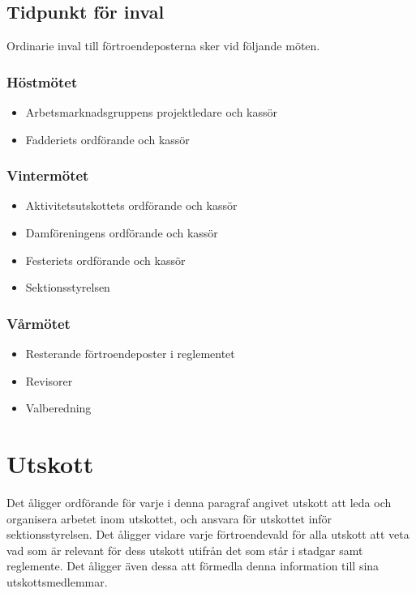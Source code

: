 \documentclass{datateknologsektionen-document}
\begin{document}
\subsection{Tidpunkt för inval}
Ordinarie inval till förtroendeposterna sker vid följande möten.

\subsubsection{Höstmötet}
\begin{itemize}
  \item Arbetsmarknadsgruppens projektledare och kassör
  \item Fadderiets ordförande och kassör
\end{itemize}

\subsubsection{Vintermötet}
\begin{itemize}
  \item Aktivitetsutskottets ordförande och kassör
  \item Damföreningens ordförande och kassör
  \item Festeriets ordförande och kassör
  \item Sektionsstyrelsen
\end{itemize}

\subsubsection{Vårmötet}
\begin{itemize}
  \item Resterande förtroendeposter i reglementet
  \item Revisorer
  \item Valberedning
\end{itemize}

\section{Utskott}
Det åligger ordförande för varje i denna paragraf angivet utskott att leda och organisera arbetet inom utskottet, och
ansvara för utskottet inför sektionsstyrelsen. Det åligger vidare varje förtroendevald
för alla utskott att veta vad som är relevant för dess utskott utifrån det som står i
stadgar samt reglemente. Det åligger även dessa att förmedla denna information till
sina utskottsmedlemmar.
\end{document}
